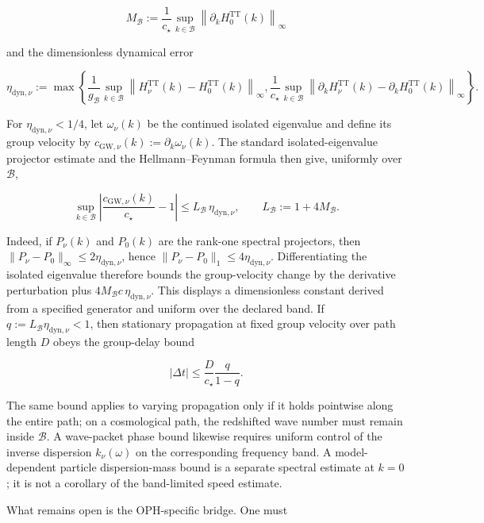 \[
M_{\mathcal B}
:=\frac{1}{c_\star}\sup_{k\in\mathcal B}
\left\|\partial_k H_0^{\mathrm{TT}}(k)\right\|_\infty
\]

and the dimensionless dynamical error

\[
\eta_{\mathrm{dyn},\nu}
:=\max\!\left\{
\frac{1}{g_{\mathcal B}}\sup_{k\in\mathcal B}
\left\|H_\nu^{\mathrm{TT}}(k)-H_0^{\mathrm{TT}}(k)\right\|_\infty,
\frac{1}{c_\star}\sup_{k\in\mathcal B}
\left\|\partial_k H_\nu^{\mathrm{TT}}(k)-\partial_k H_0^{\mathrm{TT}}(k)\right\|_\infty
\right\}.
\]

For \(\eta_{\mathrm{dyn},\nu}<1/4\), let \(\omega_\nu(k)\) be the continued isolated eigenvalue and define its group velocity by \(c_{\mathrm{GW},\nu}(k):=\partial_k\omega_\nu(k)\). The standard isolated-eigenvalue projector estimate and the Hellmann--Feynman formula then give, uniformly over \(\mathcal B\),

\[
\sup_{k\in\mathcal B}
\left|\frac{c_{\mathrm{GW},\nu}(k)}{c_\star}-1\right|
\le L_{\mathcal B}\,\eta_{\mathrm{dyn},\nu},
\qquad
L_{\mathcal B}:=1+4M_{\mathcal B}.
\]

Indeed, if \(P_\nu(k)\) and \(P_0(k)\) are the rank-one spectral projectors, then \(\|P_\nu-P_0\|_\infty\le2\eta_{\mathrm{dyn},\nu}\), hence \(\|P_\nu-P_0\|_1\le4\eta_{\mathrm{dyn},\nu}\). Differentiating the isolated eigenvalue therefore bounds the group-velocity change by the derivative perturbation plus \(4M_{\mathcal B}c\,\eta_{\mathrm{dyn},\nu}\). This displays a dimensionless constant derived from a specified generator and uniform over the declared band. If \(q:=L_{\mathcal B}\eta_{\mathrm{dyn},\nu}<1\), then stationary propagation at fixed group velocity over path length \(D\) obeys the group-delay bound

\[
|\Delta t|\le \frac{D}{c_\star}\frac{q}{1-q}.
\]

The same bound applies to varying propagation only if it holds pointwise along the entire path; on a cosmological path, the redshifted wave number must remain inside \(\mathcal B\). A wave-packet phase bound likewise requires uniform control of the inverse dispersion \(k_\nu(\omega)\) on the corresponding frequency band. A model-dependent particle dispersion-mass bound is a separate spectral estimate at \(k=0\); it is not a corollary of the band-limited speed estimate.

What remains open is the OPH-specific bridge. One must


